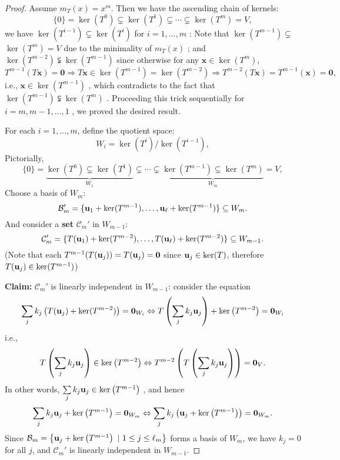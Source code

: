 \begin{proof}
Assume \( m_T(x) = x^m \). Then we have the ascending chain of kernels:
\[
\{0\} = \ker(T^0) \subsetneq \ker(T^1) \subsetneq \cdots \subsetneq \ker(T^m) = V,
\]
we have \(\ker \left( {T}^{i - 1}\right)  \subsetneq  \ker \left( {T}^{i}\right)\) for \(i = 1,\ldots ,m\) : Note that \(\ker \left( {T}^{m - 1}\right)  \subsetneq\)  \(\ker \left( {T}^{m}\right) = V\) due to the minimality of \({m}_{T}\left( x\right)\) ; and \(\ker \left( {T}^{m - 2}\right)  \subsetneqq  \ker \left( {T}^{m - 1}\right)\) since otherwise for any \(\mathbf{x} \in  \ker \left( {T}^{m}\right)\),
\[
{T}^{m - 1}\left( {T\mathbf{x}}\right)  = \mathbf{0} \Rightarrow  T\mathbf{x} \in  \ker \left( {T}^{m - 1}\right)  = \ker \left( {T}^{m - 2}\right)  \Rightarrow  {T}^{m - 2}\left( {T\mathbf{x}}\right)  = {T}^{m - 1}\left( \mathbf{x}\right)  = \mathbf{0},
\]
i.e., \(\mathbf{x} \in  \ker \left( {T}^{m - 1}\right)\) , which contradicts to the fact that \(\ker \left( {T}^{m - 1}\right)  \subsetneqq  \ker \left( {T}^{m}\right)\) . Proceeding this trick sequentially for \(i = m,m - 1,\ldots ,1\) , we proved the desired result.


For each \( i = 1, \ldots, m \), define the quotient space:
\[
W_i = \ker(T^i)/\ker(T^{i-1}),
\]
Pictorially, 
\[
\{0\} = \underbrace{\ker(T^0) \subsetneq \ker(T^1)}_{W_1} \subsetneq \cdots  \subsetneq \underbrace{\ker(T^{m-1}) \subsetneq \ker(T^m)}_{W_m} = V,
\]
Choose a basis of $W_m$:
\[
\mathcal{B}_m' = \{ {\bf u}_1 + \ker(T^{m-1}), \ldots, {\bf u}_{\ell} + \ker(T^{m-1}) \} \subseteq W_m.
\]
And consider a {\bf set} $\mathcal{C}_m'$ in $W_{m-1}$:
\[
\mathcal{C}_m' = \{ T({\bf u}_1) + \ker(T^{m-2}), \ldots, T({\bf u}_{\ell}) + \ker(T^{m-2}) \} \subseteq W_{m-1}.
\]
(Note that each $T^{m-1}(T({\bf u}_j)) = T({\bf u}_j) = {\bf 0}$ since ${\bf u}_j \in \ker(T)$, therefore $T({\bf u}_j) \in \ker(T^{m-1})$)

{\bf Claim:} \(\mathcal{C}_{m}'\) is linearly independent in $W_{m-1}$: consider the equation
\[
\mathop{\sum }\limits_{j}k_j\left( T({\bf u}_j) + \ker(T^{m-2})\right)  = {\mathbf{0}}_{{W}_{i}} \Leftrightarrow  T\left( {\mathop{\sum }\limits_{j}k_j{\bf u}_j}\right)  + \ker \left( {T}^{m - 2}\right)  = {\mathbf{0}}_{{W}_{i}}
\]
i.e.,
\[
T\left( {\mathop{\sum }\limits_{j}k_j{\bf u}_j}\right)  \in  \ker \left( {T}^{m - 2}\right)  \Leftrightarrow  {T}^{m-2}\left( T\left( {\mathop{\sum }\limits_{j}k_j{\bf u}_j}\right)\right)  = {\mathbf{0}}_{V}.
\]
In other words, ${\mathop{\sum }\limits_{j}k_j{\bf u}_j} \in  \ker \left( {T}^{m-1}\right)$ , and hence
\[
{\mathop{\sum }\limits_{j}k_j{\bf u}_j} + \ker \left( {T}^{m-1}\right)  = {\mathbf{0}}_{W_m} \Leftrightarrow  \mathop{\sum }\limits_{j}k_j\left( {{{\bf u}_j} + \ker \left( {T}^{m-1}\right) }\right)  = {\mathbf{0}}_{W_m}.
\]
Since \(\mathcal{B}_m = \left\{ {\bf u}_j + \ker \left( {T}^{m-1}\right)\ |\ 1 \leq j \leq \ell_m\right\}\) forms a basis of \({W}_m\), we have \(k_j = 0\) for all \(j\), and $\mathcal{C}_m'$ is linearly independent in $W_{m-1}$. 


\end{proof}
